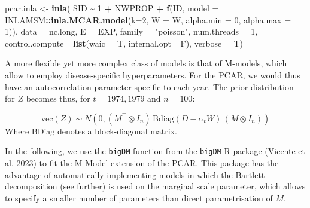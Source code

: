 \documentclass[
]{article}
\newenvironment{Shaded}{\begin{snugshade}}{\end{snugshade}}
\newcommand{\AttributeTok}[1]{\textcolor[rgb]{0.13,0.29,0.53}{#1}}
\newcommand{\DecValTok}[1]{\textcolor[rgb]{0.00,0.00,0.81}{#1}}
\newcommand{\FunctionTok}[1]{\textcolor[rgb]{0.13,0.29,0.53}{\textbf{#1}}}
\newcommand{\NormalTok}[1]{#1}
\newcommand{\OtherTok}[1]{\textcolor[rgb]{0.56,0.35,0.01}{#1}}
\newcommand{\SpecialCharTok}[1]{\textcolor[rgb]{0.81,0.36,0.00}{\textbf{#1}}}
\newcommand{\StringTok}[1]{\textcolor[rgb]{0.31,0.60,0.02}{#1}}
\begin{document}
\begin{Shaded}
\begin{Highlighting}[]
\NormalTok{pcar.inla }\OtherTok{\textless{}{-}} \FunctionTok{inla}\NormalTok{(}
\NormalTok{  SID }\SpecialCharTok{\textasciitilde{}} \DecValTok{1} \SpecialCharTok{+}\NormalTok{ NWPROP }\SpecialCharTok{+} 
    \FunctionTok{f}\NormalTok{(ID, }\AttributeTok{model =}\NormalTok{ INLAMSM}\SpecialCharTok{::}\FunctionTok{inla.MCAR.model}\NormalTok{(}\AttributeTok{k=}\DecValTok{2}\NormalTok{, }\AttributeTok{W =}\NormalTok{ W, }\AttributeTok{alpha.min =} \DecValTok{0}\NormalTok{, }\AttributeTok{alpha.max =} \DecValTok{1}\NormalTok{)),}
  \AttributeTok{data =}\NormalTok{ nc.long, }\AttributeTok{E =}\NormalTok{ EXP, }
  \AttributeTok{family =} \StringTok{"poisson"}\NormalTok{, }\AttributeTok{num.threads =} \DecValTok{1}\NormalTok{,}
  \AttributeTok{control.compute =}\FunctionTok{list}\NormalTok{(}\AttributeTok{waic =}\NormalTok{ T, }\AttributeTok{internal.opt =}\NormalTok{F),}
  \AttributeTok{verbose =}\NormalTok{ T)}
\end{Highlighting}
\end{Shaded}

A more flexible yet more complex class of models is that of M-models,
which allow to employ disease-specific hyperparameters. For the PCAR, we
would thus have an autocorrelation parameter specific to each year. The
prior distribution for \(Z\) becomes thus, for \(t = 1974, 1979\) and
\(n=100\):

\[
\mathrm{vec}(Z) \sim N \left( 0, (M^\top \otimes I_n) \,
  \mathrm{Bdiag}(D - \alpha_t W) \, (M \otimes I_n)\right)
\] Where \(\mathrm{BDiag}\) denotes a block-diagonal matrix.

In the following, we use the \texttt{bigDM} function from the
\texttt{bigDM} R package (Vicente et al. 2023) to fit the M-Model
extension of the PCAR. This package has the advantage of automatically
implementing models in which the Bartlett decomposition (see further) is
used on the marginal scale parameter, which allows to specify a smaller
number of parameters than direct parametrisation of \(M\).
\end{document}
